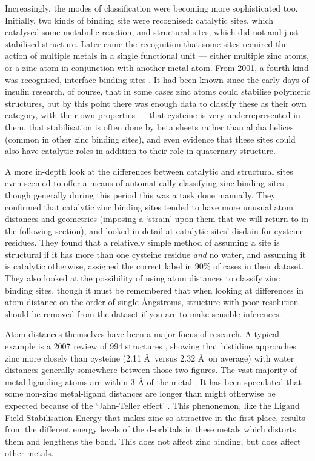 Increasingly, the modes of classification were becoming more sophisticated too. Initially, two kinds of binding site were recognised: catalytic sites, which catalysed some metabolic reaction, and structural sites, which did not and just stabilised structure. Later came the recognition that some sites required the action of multiple metals in a single functional unit --- either multiple zinc atoms, or a zinc atom in conjunction with another metal atom. From 2001, a fourth kind was recognised, interface binding sites \cite{auld2001zinc}. It had been known since the early days of insulin research, of course, that in some cases zinc atoms could stabilise polymeric structures, but by this point there was enough data to classify these as their own category, with their own properties --- that cysteine is very underrepresented in them, that stabilisation is often done by beta sheets rather than alpha helices (common in other zinc binding sites), and even evidence that these sites could also have catalytic roles in addition to their role in quaternary structure.

A more in-depth look at the differences between catalytic and structural sites even seemed to offer a means of automatically classifying zinc binding sites \cite{lee2008physical}, though generally during this period this was a task done manually. They confirmed that catalytic zinc binding sites tended to have more unusual atom distances and geometries (imposing a `strain' upon them that we will return to in the following section), and looked in detail at catalytic sites' disdain for cysteine residues. They found that a relatively simple method of assuming a site is structural if it has more than one cysteine residue \textit{and} no water, and assuming it is catalytic otherwise, assigned the correct label in 90\% of cases in their dataset. They also looked at the possibility of using atom distances to classify zinc binding sites, though it must be remembered that when looking at differences in atom distance on the order of single {\AA}ngstroms, structure with poor resolution should be removed from the dataset if you are to make sensible inferences.

Atom distances themselves have been a major focus of research. A typical example is a 2007 review of 994 structures \cite{tamames2007analysis}, showing that histidine approaches zinc more closely than cysteine (2.11 \AA \ versus 2.32 \AA \ on average) with water distances generally somewhere between those two figures. The vast majority of metal liganding atoms are within 3 {\AA} of the metal \cite{dokmanic2008metals}. It has been speculated that some non-zinc metal-ligand distances are longer than might otherwise be expected because of the `Jahn-Teller effect' \cite{doi:10.1002/prot.21601}. This phenonemon, like the Ligand Field Stabilisation Energy that makes zinc so attractive in the first place, results from the different energy levels of the d-orbitals in these metals which distorts them and lengthens the bond. This does not affect zinc binding, but does affect other metals.

